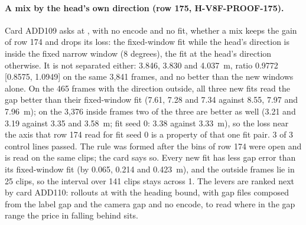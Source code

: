\paragraph{A mix by the head's own direction (row 175, H-V8F-PROOF-175).} Card ADD109 asks at , with no encode and no fit, whether a mix keeps the gain of row 174 and drops its loss: the fixed-window fit while the head's direction is inside the fixed narrow window (8 degrees), the fit at the head's direction otherwise. It is not separated either: 3.846, 3.830 and 4.037~m, ratio 0.9772 [0.8575, 1.0949] on the same 3,841 frames, and no better than the new windows alone. On the 465 frames with the direction outside, all three new fits read the gap better than their fixed-window fit (7.61, 7.28 and 7.34 against 8.55, 7.97 and 7.96~m); on the 3,376 inside frames two of the three are better as well (3.21 and 3.19 against 3.35 and 3.58~m; fit seed 0: 3.38 against 3.33~m), so the loss near the axis that row 174 read for fit seed 0 is a property of that one fit pair. 3 of 3 control lines passed. The rule was formed after the bins of row 174 were open and is read on the same clips; the card says so. Every new fit has less gap error than its fixed-window fit (by 0.065, 0.214 and 0.423~m), and the outside frames lie in 25 clips, so the interval over 141 clips stays across 1. The levers are ranked next by card ADD110: rollouts at  with the heading bound, with gap files composed from the label gap and the camera gap and no encode, to read where in the gap range the price in falling behind sits.

